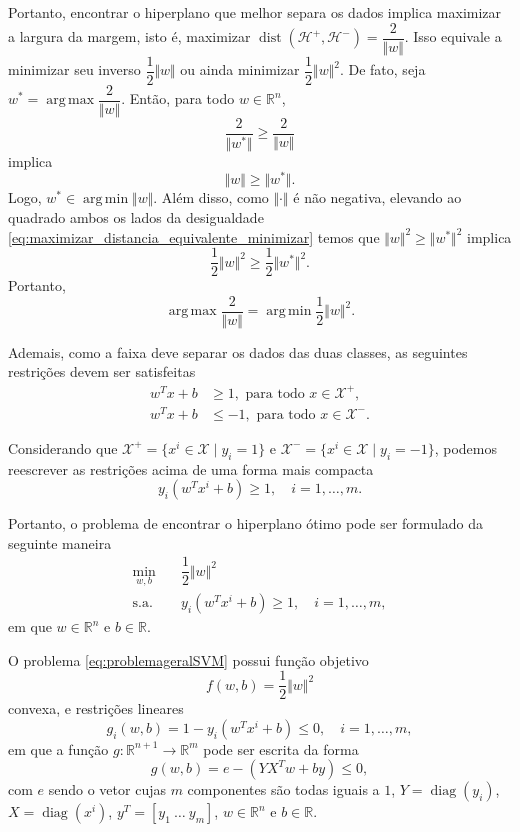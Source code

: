 \documentclass[12pt,a4paper]{scrartcl}
\DeclareMathOperator*{\argmax}{arg\, max}
\DeclareMathOperator*{\argmin}{arg\, min}
\DeclareMathOperator{\diag}{diag}
\DeclareMathOperator{\dist}{dist}
\def\Xset{\mathcal{X}}
\def\Hset{\mathcal{H}}
\def\RR{\mathds{R}}
\theoremstyle{definition}%
\begin{document}
Portanto, encontrar o hiperplano que melhor separa os dados implica maximizar a largura da margem, isto é, maximizar $\dist(\Hset^{+} , \Hset^{-}) =\dfrac{2}{\Vert w\Vert }$. Isso equivale a minimizar seu inverso $\dfrac{1}{2}\Vert w\Vert $ ou ainda minimizar $\dfrac{1}{2}\Vert w\Vert^{2}$. De fato, seja $w^{*}=\argmax\dfrac{2}{\Vert w\Vert}$. Então, para todo $w\in \RR^n$,
\[ 
\dfrac{2}{\Vert w^{*}\Vert} \geq \dfrac{2}{\Vert w\Vert} 
\]
implica
\[ \label{eq:maximizar_distancia_equivalente_minimizar} 
\Vert w\Vert \geq \Vert w^{*}\Vert. 
\]
Logo, $w^{*} \in \argmin\Vert w\Vert$. Além disso, como $\Vert \cdot \Vert$ é não negativa, elevando ao quadrado ambos os lados da desigualdade \eqref{eq:maximizar_distancia_equivalente_minimizar} temos que  $\Vert w\Vert^{2} \geq \Vert w^{*}\Vert^{2}$ implica
\[ 
\dfrac{1}{2}\Vert w\Vert^{2} \geq \dfrac{1}{2}\Vert w^{*}\Vert^{2}. 
\]
Portanto, 
\[ \argmax\dfrac{2}{\Vert w\Vert} = \argmin\dfrac{1}{2}\Vert w\Vert^2. \]

Ademais, como a faixa deve separar os dados das duas classes, as seguintes restrições devem ser satisfeitas
\begin{align}
w^{T}x+b &\geq 1 , \text{ para  todo } x\in \Xset^{+}, \\
w^{T}x+b &\leq -1 , \text{ para  todo } x\in \Xset^{-}.
\end{align}

Considerando que $\Xset^{+}=\{x^i \in \Xset\mid y_i=1\}$ e $\Xset^{-}=\{x^i \in \Xset \mid y_i=-1\}$, podemos reescrever as restrições acima de uma forma mais compacta 
\[ y_{i}(w^{T}x^{i}+b)\geq 1, \quad i=1, \ldots ,m. \]

Portanto, o problema de encontrar o hiperplano ótimo pode ser formulado da seguinte maneira
\[ \label{eq:problemageralSVM}
\begin{aligned}
\min_{w,b} & \quad \dfrac{1}{2} \Vert w\Vert^{2} \\
\text{s.a.} &  \quad y_i(w^{T}x^{i}+b) \geq 1, \quad i=1, \ldots , m, 
\end{aligned}
\]
em que $w\in \RR^{n}$ e $b\in \RR$. 

O problema \eqref{eq:problemageralSVM} possui função objetivo 
\[ f(w,b)=\dfrac{1}{2}\Vert w\Vert^{2} \]
convexa, e restrições lineares
\[ g_i(w,b)=1-y_i(w^{T}x^{i}+b) \leq 0, \quad i=1, \ldots, m, \]
em que a função $g:\RR^{n+1} \rightarrow \RR^{m}$ pode ser escrita da forma 
\[ g(w,b)= e - (YX^{T}w+by) \leq 0, \]
com $e$ sendo o vetor cujas $m$ componentes são todas iguais a $1$, $Y=\diag(y_{i})$, $X=\diag(x^{i})$, $y^{T}=[y_{1} \ \ldots \ y_{m}]$, $w\in \RR^n$ e $b\in \RR$.
\end{document}
